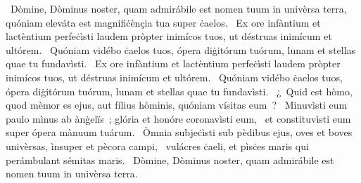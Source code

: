 ~Dòmine, Dòminus noster, quam admirábile est nomen tuum in univèrsa terra, quóniam eleváta est magnifiċènçia tua super ċaelos. 
~Ex ore infàntium et lactèntium perfeċìsti laudem pròpter inimícos tuos, ut déstruas inimícum et ultórem. 
~Quóniam vidébo ċaelos tuos, ópera diġitórum tuórum, lunam et stellas quae tu fundavìsti. 
~Ex ore infàntium et lactèntium perfeċìsti laudem pròpter inimícos tuos, ut déstruas inimícum et ultórem. 
~Quóniam vidébo ċaelos tuos, ópera diġitórum tuórum, lunam et stellas quae tu fundavìsti. 
~¿~Quid est hòmo, quod mèmor es ejus, aut fílius hòminis, quóniam vísitas eum~? 
~Minuvìsti eum paulo mìnus ab ànġelïs~; glória et honóre coronavìsti eum, 
~et constituvìsti eum super ópera mànuum tuárum. 
~Òmnia subjeċìsti sub pèdibus ejus, oves et boves univèrsas, ìnsuper et pècora campi, 
~vulácres ċaeli, et pìsċes maris qui perámbulant sémitas maris. 
~Dòmine, Dòminus noster, quam admirábile est nomen tuum in univèrsa terra. 
